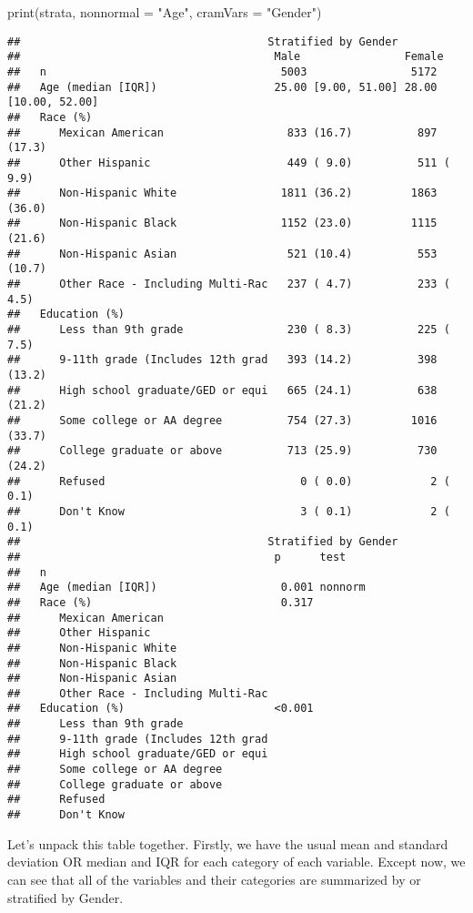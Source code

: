 \documentclass[
]{book}
\newenvironment{Shaded}{\begin{snugshade}}{\end{snugshade}}
\newcommand{\AttributeTok}[1]{\textcolor[rgb]{0.77,0.63,0.00}{#1}}
\newcommand{\FunctionTok}[1]{\textcolor[rgb]{0.00,0.00,0.00}{#1}}
\newcommand{\NormalTok}[1]{#1}
\newcommand{\StringTok}[1]{\textcolor[rgb]{0.31,0.60,0.02}{#1}}
\begin{document}
\begin{Shaded}
\begin{Highlighting}[]
\FunctionTok{print}\NormalTok{(strata, }
      \AttributeTok{nonnormal =} \StringTok{"Age"}\NormalTok{, }
      \AttributeTok{cramVars =} \StringTok{"Gender"}\NormalTok{)}
\end{Highlighting}
\end{Shaded}

\begin{verbatim}
##                                      Stratified by Gender
##                                       Male                Female
##   n                                    5003                5172
##   Age (median [IQR])                  25.00 [9.00, 51.00] 28.00 [10.00, 52.00]
##   Race (%)
##      Mexican American                   833 (16.7)          897 (17.3)
##      Other Hispanic                     449 ( 9.0)          511 ( 9.9)
##      Non-Hispanic White                1811 (36.2)         1863 (36.0)
##      Non-Hispanic Black                1152 (23.0)         1115 (21.6)
##      Non-Hispanic Asian                 521 (10.4)          553 (10.7)
##      Other Race - Including Multi-Rac   237 ( 4.7)          233 ( 4.5)
##   Education (%)
##      Less than 9th grade                230 ( 8.3)          225 ( 7.5)
##      9-11th grade (Includes 12th grad   393 (14.2)          398 (13.2)
##      High school graduate/GED or equi   665 (24.1)          638 (21.2)
##      Some college or AA degree          754 (27.3)         1016 (33.7)
##      College graduate or above          713 (25.9)          730 (24.2)
##      Refused                              0 ( 0.0)            2 ( 0.1)
##      Don't Know                           3 ( 0.1)            2 ( 0.1)
##                                      Stratified by Gender
##                                       p      test
##   n
##   Age (median [IQR])                   0.001 nonnorm
##   Race (%)                             0.317
##      Mexican American
##      Other Hispanic
##      Non-Hispanic White
##      Non-Hispanic Black
##      Non-Hispanic Asian
##      Other Race - Including Multi-Rac
##   Education (%)                       <0.001
##      Less than 9th grade
##      9-11th grade (Includes 12th grad
##      High school graduate/GED or equi
##      Some college or AA degree
##      College graduate or above
##      Refused
##      Don't Know
\end{verbatim}

Let's unpack this table together. Firstly, we have the usual mean and standard deviation OR median and IQR for each category of each variable. Except now, we can see that all of the variables and their categories are summarized by or stratified by Gender.
\end{document}
